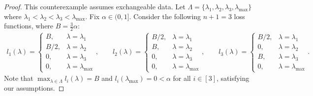\begin{proof}
This counterexample assumes exchangeable data.
Let $\Lambda = \{\lambda_1, \lambda_2, \lambda_3, \lambda_{\max}\}$ where $\lambda_1 < \lambda_2 < \lambda_3 < \lambda_{\max}$.
Fix $\alpha \in (0, 1]$.
Consider the following $n + 1 = 3$ loss functions, where $B = \frac{3}{2}\alpha$:
\begin{align}
\label{eq:bag-loss}
l_1(\lambda) =
    \begin{cases}
    B, & \lambda = \lambda_1 \\
    B/2, & \lambda = \lambda_2 \\
    0, & \lambda = \lambda_3 \\
    0, & \lambda = \lambda_{\max}
  \end{cases}, \qquad 
    l_2(\lambda) =
    \begin{cases}
    B/2, & \lambda = \lambda_1 \\
    B, & \lambda = \lambda_2 \\
    0, & \lambda = \lambda_3 \\
    0, & \lambda = \lambda_{\max}
  \end{cases}, \qquad 
    l_3(\lambda) =
    \begin{cases}
    B/2, & \lambda = \lambda_1 \\
    0, & \lambda = \lambda_2 \\
    B, & \lambda = \lambda_3 \\
    0, & \lambda = \lambda_{\max}
  \end{cases}.
\end{align}
Note that $\max_{\lambda \in \Lambda} l_i(\lambda) = B$ and $l_i(\lambda_{\max}) = 0 < \alpha$ for all $i \in [3]$, satisfying our assumptions.


\end{proof}
